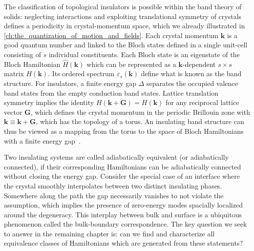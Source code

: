 The classification of topological insulators is possible within the band theory of solids: neglecting interactions and exploiting translational symmetry of crystals defines a periodicity in crystal-momentum space, which we already illustrated in \cref{ch:the_quantization_of_motion_and_fields}.
Each crystal momentum ${\bm k}$ is a good quantum number and linked to the Bloch states defined in a single unit-cell consisting of $s$ individual constituents.
Each Bloch state is an eigenstate of the Bloch Hamiltonian $\hat H(\bm k)$ which can be represented as a $\bm k$-dependent $s\times s$ matrix $H(\bm k)$.
Its ordered spectrum $\varepsilon_s(\bm k)$ define what is known as the band structure.
For insulators, a finite energy gap $\Delta$ separates the occupied valence band states from the empty conduction band states.
Lattice translation symmetry implies the identity $H(\bm k + \bm G) = H(\bm k)$ for any reciprocal lattice vector $\bm G$, which defines the crystal momentum in the periodic Brillouin zone with $\bm k\equiv \bm k+\bm G$, which has the topology of a torus.
An insulating band structure can thus be viewed as a mapping from the torus to the space of Bloch Hamiltonians with a finite energy gap~\cite{Kane2013}.

Two insulating systems are called adiabatically equivalent (or adiabatically connected), if their corresponding Hamiltonians can be adiabatically connected without closing the energy gap.
Consider the special case of an interface where the crystal smoothly interpolates between two distinct insulating phases.
Somewhere along the path the gap necessarily vanishes to not violate the assumption, which implies the presence of zero-energy modes spacially localized around the degeneracy.
This interplay between bulk and surface is a ubiquitous phenomenon called the bulk-boundary correspondence.
The key question we seek to answer in the remaining chapter is: can we find and characterize all equivalence classes of Hamiltonians which are generated from these statements?

